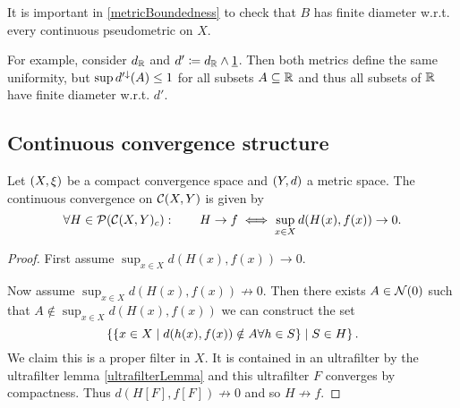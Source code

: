 \begin{example}
It is important in \ref{metricBoundedness} to check that $B$ has finite diameter w.r.t. every continuous pseudometric on $X$.

For example, consider $d_{\mathbb{R}}$ and $d' \coloneqq d_{\mathbb{R}} \wedge \underline{1}$. Then both metrics define the same uniformity, but $\sup d^{\prime\downarrow}(A) \leq 1$ for all subsets $A\subseteq \mathbb{R}$ and thus all subsets of $\mathbb{R}$ have finite diameter w.r.t. $d'$. 
\end{example}

\subsection{Continuous convergence structure}
\begin{proposition}
Let $\left( X,\xi \right)$ be a compact convergence space and $\left( Y,d \right)$ a metric space. The continuous convergence on $\operatorname{\mathcal{C}}(X,Y)$ is given by
\[ \forall H\in\operatorname{\mathcal{P}}(\operatorname{\mathcal{C}}(X,Y)_c): \qquad H\to f \iff \sup_{x\in X}d(H(x), f(x)) \to 0. \]
\end{proposition}
\begin{proof}
First assume $\sup_{x\in X}d(H(x), f(x)) \to 0$. 

Now assume $\sup_{x\in X}d(H(x), f(x)) \not\to 0$. Then there exists $A\in \operatorname{\mathcal{N}}(0)$ such that $A \notin \sup_{x\in X}d(H(x), f(x))$ we can construct the set
\[ \left\{ \left\{ x\in X \;\middle|\; d(h(x), f(x)) \notin A \forall h\in S \right\} \;\middle|\; S\in H \right\}. \]
We claim this is a proper filter in $X$. It is contained in an ultrafilter by the ultrafilter lemma \ref{ultrafilterLemma} and this ultrafilter $F$ converges by compactness. Thus $d(H[F], f[F]) \not\to 0$ and so $H\not\to f$.
\end{proof}


